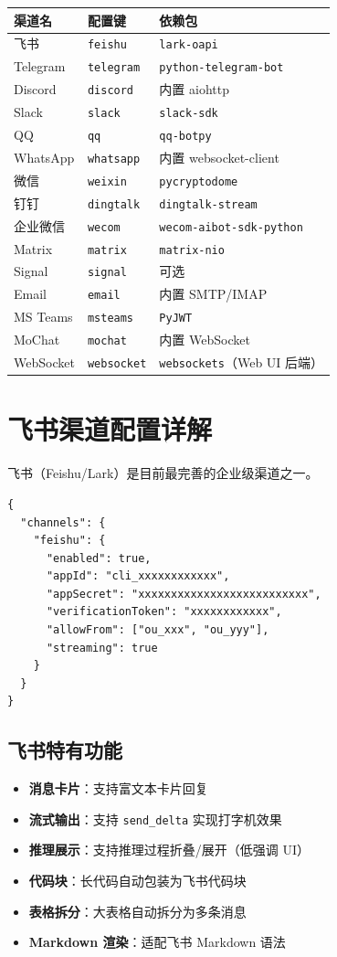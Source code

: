 \documentclass[12pt,a4paper,UTF8]{ctexart}
\begin{document}
\begin{longtable}{L{2.5cm} L{5cm} L{7.5cm}}
\toprule
\textbf{渠道名} & \textbf{配置键} & \textbf{依赖包} \\
\midrule
飞书 & \texttt{feishu} & \texttt{lark-oapi} \\
Telegram & \texttt{telegram} & \texttt{python-telegram-bot} \\
Discord & \texttt{discord} & 内置 aiohttp \\
Slack & \texttt{slack} & \texttt{slack-sdk} \\
QQ & \texttt{qq} & \texttt{qq-botpy} \\
WhatsApp & \texttt{whatsapp} & 内置 websocket-client \\
微信 & \texttt{weixin} & \texttt{pycryptodome} \\
钉钉 & \texttt{dingtalk} & \texttt{dingtalk-stream} \\
企业微信 & \texttt{wecom} & \texttt{wecom-aibot-sdk-python} \\
Matrix & \texttt{matrix} & \texttt{matrix-nio} \\
Signal & \texttt{signal} & 可选 \\
Email & \texttt{email} & 内置 SMTP/IMAP \\
MS Teams & \texttt{msteams} & \texttt{PyJWT} \\
MoChat & \texttt{mochat} & 内置 WebSocket \\
WebSocket & \texttt{websocket} & \texttt{websockets}（Web UI 后端） \\
\bottomrule
\end{longtable}

\section{飞书渠道配置详解}

飞书（Feishu/Lark）是目前最完善的企业级渠道之一。

\begin{verbatim}
{
  "channels": {
    "feishu": {
      "enabled": true,
      "appId": "cli_xxxxxxxxxxxx",
      "appSecret": "xxxxxxxxxxxxxxxxxxxxxxxxxx",
      "verificationToken": "xxxxxxxxxxxx",
      "allowFrom": ["ou_xxx", "ou_yyy"],
      "streaming": true
    }
  }
}
\end{verbatim}

\subsection{飞书特有功能}
\begin{itemize}
    \item \textbf{消息卡片}：支持富文本卡片回复
    \item \textbf{流式输出}：支持 \texttt{send\_delta} 实现打字机效果
    \item \textbf{推理展示}：支持推理过程折叠/展开（低强调 UI）
    \item \textbf{代码块}：长代码自动包装为飞书代码块
    \item \textbf{表格拆分}：大表格自动拆分为多条消息
    \item \textbf{Markdown 渲染}：适配飞书 Markdown 语法
\end{itemize}
\end{document}
